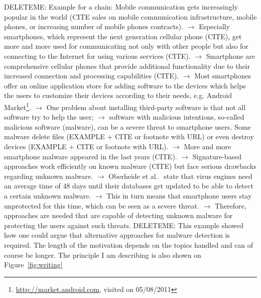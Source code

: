 DELETEME: Example for a chain: Mobile communication gets increasingly popular in the world (CITE sales on mobile communication infrastructure, mobile phones, or increasing number of mobile phones contracts). $\rightarrow$ Especially smartphones, which represent the next generation cellular phone (CITE), get more and more used for communicating not only with other people but also for connecting to the Internet for using various services (CITE). $\rightarrow$ Smartphone are comprehensive cellular phones that provide additional functionality due to their increased connection and processing capabilities (CITE). $\rightarrow$ Most smartphones offer an online application store for adding software to the devices which helps the users to customize their devices according to their needs, e.g. Android Market\footnote{\url{http://market.android.com}, visited on 05/08/2011}. $\rightarrow$ One problem about installing third-party software is that not all software try to help the user; $\rightarrow$ software with malicious intentions, so-called malicious software (malware), can be a severe threat to smartphone users. Some malware delete files (EXAMPLE + CITE or footnote with URL) or even destroy devices (EXAMPLE + CITE or footnote with URL). $\rightarrow$ More and more smartphone malware appeared in the last years (CITE). $\rightarrow$ Signature-based approaches work efficiently on known malware (CITE) but face serious drawbacks regarding unknown malware. $\rightarrow$ Oberheide et al.~\cite{oberheide:2008:cloudav} state that virus engines need an average time of 48 days until their databases get updated to be able to detect a certain unknown malware. $\rightarrow$ This in turn means that smartphone users stay unprotected for this time, which can be seen as a severe threat. $\rightarrow$ Therefore, approaches are needed that are capable of detecting unknown malware for protecting the users against such threats.
DELETEME: This example showed how one could argue that alternative approaches for malware detection is required. The length of the motivation depends on the topics handled and can of course be longer. The principle I am describing is also shown on Figure~\ref{fig:writing}

